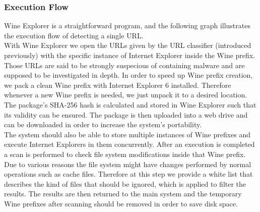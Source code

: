 \subsubsection{Execution Flow}
Wine Explorer is a straightforward program, and the following graph 
illustrates the execution flow of detecting a single URL. \\
With Wine Explorer we open the URLs given by the URL classifier (introduced 
previously) with the specific instance of Internet Explorer inside the Wine 
prefix. 
Those URLs are said to be strongly suspecious of containing malware and are 
supposed to be investigated in depth. 
In order to speed up Wine prefix creation, we pack a clean Wine prefix with 
Internet Explorer 6 installed. Therefore whenever a new Wine prefix is needed, 
we just unpack it to a desired location. 
The package's SHA-256 hash is calculated and stored in Wine Explorer such that 
its validity can be ensured. 
The package is then uploaded into a web drive and can be downloaded in 
order to increase the system's portability. \\
The system should also be able to store multiple instances of Wine prefixes 
and execute Internet Explorers in them concurrently. 
After an execution is completed a scan is performed to check file system 
modifications inside that Wine prefix. 
Due to various reasons the file system might have changes performed by normal 
operations such as cache files. 
Therefore at this step we provide a white list that describes the kind of 
files that should be ignored, which is applied to filter the results. 
The results are then returned to the main system and the temporary Wine 
prefixes after scanning should be removed in order to save disk space. 

